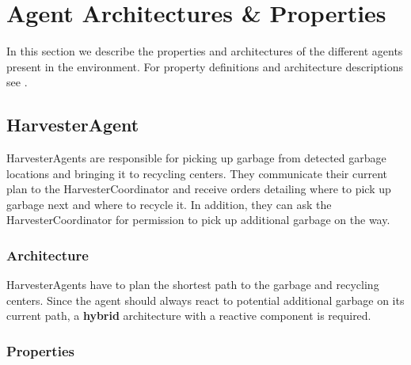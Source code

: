 \section{Agent Architectures \& Properties}

In this section we describe the properties and architectures of the different agents present in the environment. For property definitions and architecture descriptions see \cite{Woolridge2009}.

\subsection{HarvesterAgent}

HarvesterAgents are responsible for picking up garbage from detected garbage locations and bringing it to recycling centers. They communicate their current plan to the HarvesterCoordinator and receive orders detailing where to pick up garbage next and where to recycle it. In addition, they can ask the HarvesterCoordinator for permission to pick up additional garbage on the way.

\subsubsection*{Architecture}

HarvesterAgents have to plan the shortest path to the garbage and recycling centers. Since the agent should always react to potential additional garbage on its current path, a \textbf{hybrid} architecture with a reactive component is required.

\subsubsection*{Properties}

